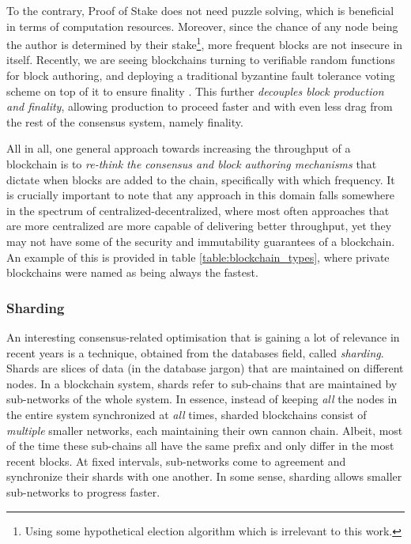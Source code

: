 To the contrary, Proof of Stake does not need puzzle solving, which is beneficial in terms
of computation resources. Moreover, since the chance of any node being the author is determined by
their stake\footnote{Using some hypothetical election algorithm which is irrelevant to this work.},
more frequent blocks are not insecure in itself. Recently, we are seeing blockchains turning to
verifiable random functions \cite{dodisVerifiableRandomFunction2005} for block authoring, and deploying
a traditional byzantine fault tolerance voting scheme on top of it to ensure finality
\cite{buterinCasperFriendlyFinality2019, stewartPosterGRANDPAFinality2019}. This further
\textit{decouples block production and finality}, allowing production to proceed faster and with
even less drag from the rest of the consensus system, namely finality.

All in all, one general approach towards increasing the throughput of a blockchain is to
\textit{re-think the consensus and block authoring mechanisms} that dictate when blocks are added to
the chain, specifically with which frequency. It is crucially important to note that any approach in
this domain falls somewhere in the spectrum of centralized-decentralized, where most often
approaches that are more centralized are more capable of delivering better throughput, yet they
may not have some of the security and immutability guarantees of a blockchain. An example of this is
provided in table \ref{table:blockchain_types}, where private blockchains were named as being always the fastest.

\subsubsection{Sharding}
An interesting consensus-related optimisation that is gaining a lot of relevance in recent years is
a technique, obtained from the databases field, called \textit{sharding}. Shards are slices of data
(in the database jargon) that are maintained on different nodes. In a blockchain system, shards
refer to sub-chains that are maintained by sub-networks of the whole system. In essence, instead of
keeping \textit{all} the nodes in the entire system synchronized at \textit{all} times, sharded
blockchains consist of \textit{multiple} smaller networks, each maintaining their own cannon chain.
Albeit, most of the time these sub-chains all have the same prefix and only differ in the most
recent blocks. At fixed intervals, sub-networks come to agreement and synchronize their shards with
one another. In some sense, sharding allows smaller sub-networks to progress
faster\cite{forestierBlockcliqueScalingBlockchains2019, al-bassamChainspaceShardedSmart2017,
shreyDiPETransFrameworkDistributed2019}.


